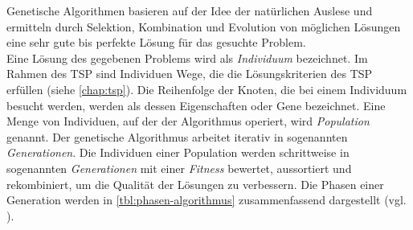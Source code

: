 \documentclass[12pt,a4paper]{scrreprt}
\begin{document}
Genetische Algorithmen basieren auf der Idee der natürlichen Auslese und ermitteln durch Selektion, Kombination und Evolution von möglichen Lösungen eine sehr gute bis perfekte Lösung für das gesuchte Problem.\\
Eine Lösung des gegebenen Problems wird als \textit{Individuum} bezeichnet. Im Rahmen des TSP sind Individuen Wege, die die Lösungskriterien des TSP erfüllen (siehe \autoref{chap:tsp}). Die Reihenfolge der Knoten, die bei einem Individuum besucht werden, werden als dessen Eigenschaften oder Gene bezeichnet. Eine Menge von Individuen, auf der der Algorithmus operiert, wird \textit{Population} genannt. Der genetische Algorithmus arbeitet iterativ in sogenannten \textit{Generationen}. Die Individuen einer Population werden schrittweise in sogenannten \textit{Generationen} mit einer \textit{Fitness} bewertet, aussortiert und rekombiniert, um die Qualität der Lösungen zu verbessern. Die Phasen einer Generation werden in \autoref{tbl:phasen-algorithmus} zusammenfassend dargestellt (vgl. \cite{jacobsen12A}).
\pagebreak
\end{document}
